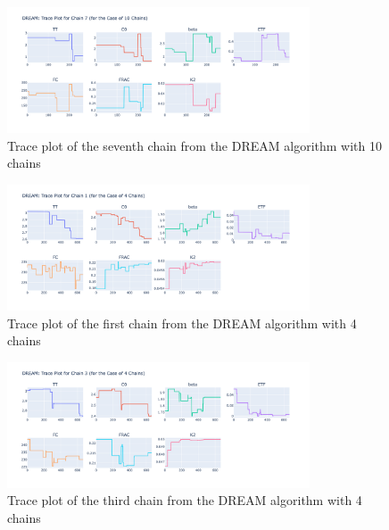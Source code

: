 \begin{figure}[H]
    \centering
    \includegraphics[width=0.8\textwidth]{figures/dream/tp_rand_10_7.png}
    \captionsetup{width=.8\textwidth}
    \caption{Trace plot of the seventh chain from the DREAM algorithm with 10 chains}
    \label{fig:enter-label}
\end{figure}

\begin{figure}[H]
    \centering
    \includegraphics[width=0.8\textwidth]{figures/dream/tp_rand_4_1.png}
    \captionsetup{width=.8\textwidth}
    \caption{Trace plot of the first chain from the DREAM algorithm with 4 chains}
    \label{fig:enter-label}
\end{figure}

\begin{figure}[H]
    \centering
    \includegraphics[width=0.8\textwidth]{figures/dream/tp_rand_4_3.png}
    \captionsetup{width=.8\textwidth}
    \caption{Trace plot of the third chain from the DREAM algorithm with 4 chains}
    \label{fig:enter-label}
\end{figure}

